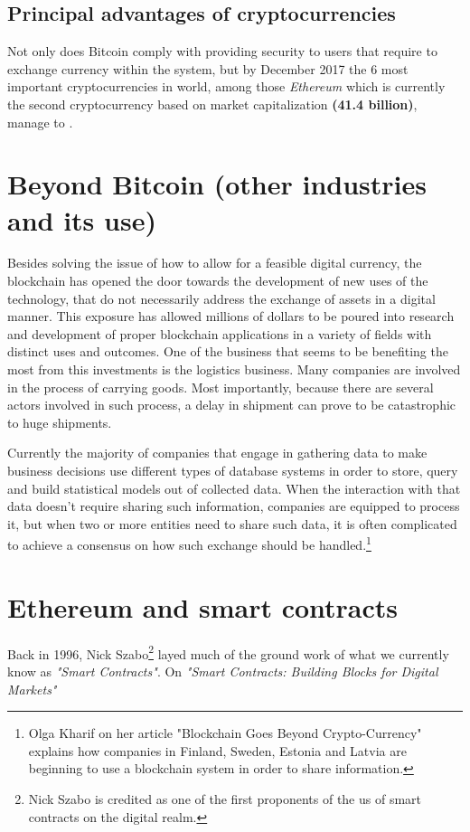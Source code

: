\documentclass[submission,copyright,creativecommons]{eptcs}
\begin{document}
\subsection{Principal advantages of cryptocurrencies}
Not only does Bitcoin comply with providing security to users that require to exchange currency within the system, but by December 2017\cite{MostImportantCryptocurrencies} the 6 most important cryptocurrencies in world, among those \textit{Ethereum} which is currently the second cryptocurrency based on market capitalization \textbf{(41.4 billion)}, manage to .

\section{Beyond Bitcoin (other industries and its use)}
Besides solving the issue of how to allow for a feasible digital currency, the blockchain has opened the door towards the development of new uses of the technology, that do not necessarily address the exchange of assets in a digital manner.  This exposure has allowed millions of dollars to be poured into research and development of proper blockchain applications in a variety of fields with distinct uses and outcomes.
One of the business that seems to be benefiting the most from this investments is the logistics business. Many companies are involved in the process of carrying goods. Most importantly, because there are several actors involved in such process, a delay in shipment can prove to be catastrophic to huge shipments.  

Currently the majority of companies that engage in gathering data to make business decisions use different types of database systems in order to store, query and build statistical models out of collected data.  When the interaction with that data doesn't require sharing such information, companies are equipped to process it, but when two or more entities\cite{BlockchainGoesCryptoCurrency2016} need to share such data, it is often complicated to achieve a consensus on how such exchange should be handled.\footnote{Olga Kharif on her article "Blockchain Goes Beyond Crypto-Currency" explains how companies in Finland, Sweden, Estonia and Latvia are beginning to use a blockchain system in order to share information.}

\section{Ethereum and smart contracts}
Back in 1996, Nick Szabo\footnote{Nick Szabo is credited as one of the first proponents of the us of smart contracts on the digital realm.} layed much of the ground work of what we currently know as \textit{"Smart Contracts"}.  On \textit{"Smart Contracts: Building Blocks for Digital Markets"}\cite{NickSzaboSmart}
\end{document}
